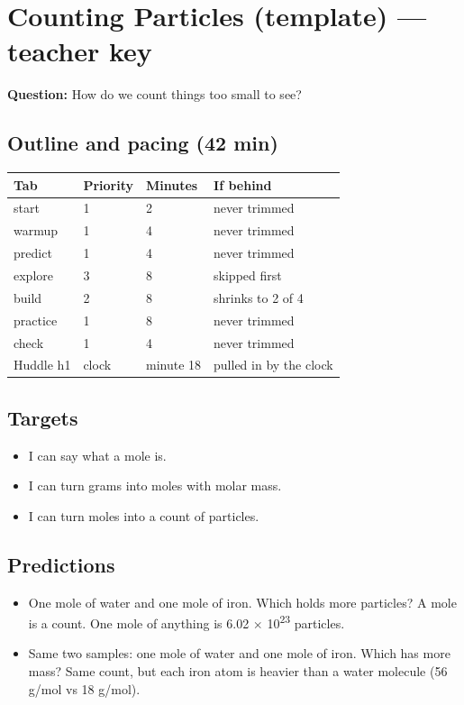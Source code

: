\documentclass[11pt]{article}
\begin{document}
\section*{Counting Particles (template) --- teacher key}
\textbf{Question:} How do we count things too small to see?\par
\subsection*{Outline and pacing (42 min)}\begin{tabular}{@{}llll@{}}\toprule Tab & Priority & Minutes & If behind\\\midrule
start & 1 & 2 & never trimmed\\
warmup & 1 & 4 & never trimmed\\
predict & 1 & 4 & never trimmed\\
explore & 3 & 8 & skipped first\\
build & 2 & 8 & shrinks to 2 of 4\\
practice & 1 & 8 & never trimmed\\
check & 1 & 4 & never trimmed\\
Huddle h1 & clock & minute 18 & pulled in by the clock\\
\bottomrule\end{tabular}
\subsection*{Targets}\begin{itemize}\item I can say what a mole is.
\item I can turn grams into moles with molar mass.
\item I can turn moles into a count of particles.\end{itemize}
\subsection*{Predictions}\begin{itemize}
\item One mole of water and one mole of iron. Which holds more particles?  A mole is a count. One mole of anything is 6.02 $\times$ 10\textsuperscript{2}\textsuperscript{3} particles.
\item Same two samples: one mole of water and one mole of iron. Which has more mass?  Same count, but each iron atom is heavier than a water molecule (56 g/mol vs 18 g/mol).
\end{itemize}
\end{document}
